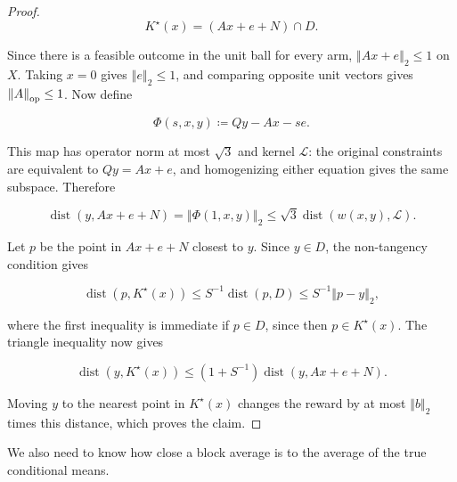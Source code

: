 {{\begin{proof}
\begin{equation*}
K^{\star} \left( x \right) = \left( A x + e + N \right) \cap D .
\end{equation*}


Since there is a feasible outcome in the unit ball for every arm,
${\left\Vert A x + e \right\Vert}_{2} \le 1$ on $X$. Taking $x = 0$ gives ${\left\Vert e \right\Vert}_{2} \le 1$, and
comparing opposite unit vectors gives ${\left\Vert A \right\Vert}_{\text{\normalfont op}} \le 1$. Now define


\begin{equation*}
\Phi \left( s , x , y \right) \coloneqq Q y - A x - s e .
\end{equation*}


This map has operator norm at most $\sqrt{3}$ and kernel $\mathcal{L}$: the
original constraints are equivalent to $Q y = A x + e$, and homogenizing
either equation gives the same subspace. Therefore


\begin{equation*}
\operatorname{dist} \left( y , A x + e + N \right) = {\left\Vert \Phi \left( 1 , x , y \right) \right\Vert}_{2} \le \sqrt{3} \operatorname{dist} \left( w \left( x , y \right) , \mathcal{L} \right) .
\end{equation*}


Let $p$ be the point in $A x + e + N$ closest to $y$. Since $y \in D$,
the non-tangency condition gives


\begin{equation*}
\operatorname{dist} \left( p , K^{\star} \left( x \right) \right) \le S^{- 1} \operatorname{dist} \left( p , D \right) \le S^{- 1} {\left\Vert p - y \right\Vert}_{2} ,
\end{equation*}


where the first inequality is immediate if $p \in D$, since then
$p \in K^{\star} \left( x \right)$. The triangle inequality now gives


\begin{equation*}
\operatorname{dist} \left( y , K^{\star} \left( x \right) \right) \le \left( 1 + S^{- 1} \right) \operatorname{dist} \left( y , A x + e + N \right) .
\end{equation*}


Moving $y$ to the nearest point in $K^{\star} \left( x \right)$ changes the reward by
at most ${\left\Vert b \right\Vert}_{2}$ times this distance, which proves the claim.
\end{proof}

We also need to know how close a block average is to the average of the
true conditional means.


}}
